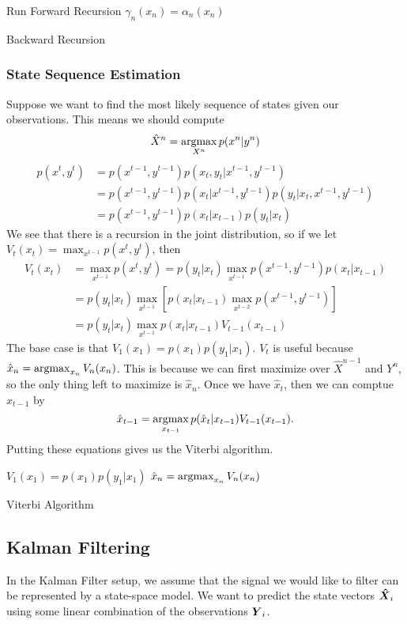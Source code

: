 \begin{algorithm}[H]
	\SetAlgoLined
	Run Forward Recursion\;
	$\gamma_n(x_n) = \alpha_n(x_n)$\;
	\caption{Backward Recursion}
\end{algorithm}
\subsubsection{State Sequence Estimation}
Suppose we want to find the most likely sequence of states given our observations.
This means we should compute \[
	\hat{X}^n = \operatorname*{argmax}_{X^n}p(x^n|y^n)
\]
\begin{align*}
	p(x^t, y^t) &= p(x^{t-1}, y^{t-1})p(x_t, y_t|x^{t-1},y^{t-1})\\
	&= p(x^{t-1}, y^{t-1})p(x_t|x^{t-1},y^{t-1})p(y_t|x_t,x^{t-1},y^{t-1}) \\
	&= p(x^{t-1},y^{t-1})p(x_t|x_{t-1})p(y_t|x_t)
\end{align*}
We see that there is a recursion in the joint distribution, so if we let $V_t(x_t) = \max_{x^{t-1}}p(x^t,y^t)$, then
\begin{align*}
	V_t(x_t) &= \max_{x^{t-1}} p(x^t, y^t) = p(y_t|x_t)\max_{x^{t-1}}p(x^{t-1},y^{t-1})p(x_t|x_{t-1})\\
	&= p(y_t|x_t)\max_{x^{t-1}}\left[p(x_t|x_{t-1}) \max_{x^{t-2}} p(x^{t-1},y^{t-1})\right]\\
	&= p(y_t|x_t)\max_{x^{t-1}}p(x_t|x_{t-1}) V_{t-1}(x_{t-1})
\end{align*}
The base case is that $V_1(x_1) = p(x_1)p(y_1|x_1)$.
$V_t$ is useful because $\hat{x}_n = \operatorname*{argmax}_{x_n}V_n(x_n)$.
This is because we can first maximize over $\hat{X}^{n-1}$ and $Y^n$, so the only thing left to maximize is $\hat{x}_n$.
Once we have $\hat{x}_t$, then we can comptue $\hat{x}_{t-1}$ by \[
	\hat{x}_{t-1} = \operatorname*{argmax}_{x_{t-1}}p(\hat{x}_t|x_{t-1})V_{t-1}(x_{t-1}).
\]
Putting these equations gives us the Viterbi algorithm.

\begin{algorithm}[H]
	\SetAlgoLined
	$V_1(x_1) = p(x_1)p(y_1|x_1)$\;
	$\hat{x}_n = \operatorname*{argmax}_{x_n} V_n(x_n)$\;
	\caption{Viterbi Algorithm}
\end{algorithm}
\subsection{Kalman Filtering}
In the Kalman Filter setup, we assume that the signal we would like to filter can be represented by a state-space model.
We want to predict the state vectors $\boldsymbol{\hat{X}}_i$ using some linear combination of the observations $\boldsymbol{Y}_i$.
